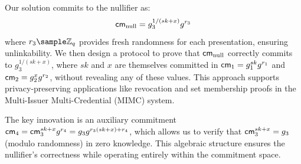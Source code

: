 Our solution commits to the nullifier as:
\[
\mathsf{cm}_{\text{null}} = g_3^{1/(sk + x)} g^{r_3}
\]
where $r_3 \sample \mathbb{Z}_q$ provides fresh randomness for each presentation, ensuring unlinkability. We then design a protocol to prove that $\mathsf{cm}_{\text{null}}$ correctly commits to $g_3^{1/(sk + x)}$, where $sk$ and $x$ are themselves committed in $\mathsf{cm}_1 = g_1^{sk} g^{r_1}$ and $\mathsf{cm}_2 = g_2^{x} g^{r_2}$, without revealing any of these values. This approach supports privacy-preserving applications like revocation and set membership proofs in the Multi-Issuer Multi-Credential (MIMC) system.

The key innovation is an auxiliary commitment $\mathsf{cm}_4 = \mathsf{cm}_3^{sk + x} g^{r_4} = g_3 g^{r_3 (sk + x) + r_4}$, which allows us to verify that $\mathsf{cm}_3^{sk + x} = g_3$ (modulo randomness) in zero knowledge. This algebraic structure ensures the nullifier’s correctness while operating entirely within the commitment space.


